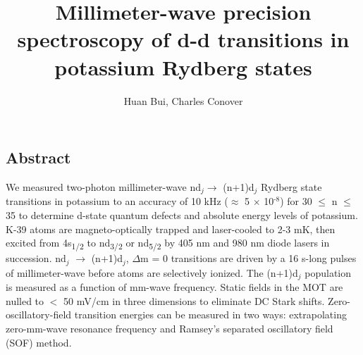 \documentclass[landscape]{sciposter}
\title{Millimeter-wave precision spectroscopy of d-d transitions in potassium Rydberg states}
\author{Huan Bui, Charles Conover}
\institute{Department of Physics and Astronomy, Colby College, Waterville, Maine}
\begin{document}
\renewcommand{\titlesize}{\fontsize{60 pt}{75 pt}\selectfont}
\renewcommand{\authorsize}{\fontsize{38 pt}{45 pt}\selectfont}
\renewcommand{\instsize}{\fontsize{38 pt}{45 pt}\selectfont}
\maketitle

\fontsize{30 pt}{38 pt}\selectfont

\begin{multicols}{4}
\setlength{\columnseprule}{0pt}

\section*{\large Abstract}
{\normalfont We measured two-photon millimeter-wave nd$_j \to$ (n+1)d$_j$ Rydberg state transitions in potassium to an accuracy of 10 kHz ($\approx$ 5 $\times$ 10$^{\text{-8}}$) for 30 $\leq$ n $\leq$ 35 to determine d-state quantum defects and absolute energy levels of potassium. K-39 atoms are magneto-optically trapped and laser-cooled to 2-3 mK, then excited from 4s\textsubscript{1/2} to nd\textsubscript{3/2} or nd\textsubscript{5/2} by 405 nm and 980 nm diode lasers in succession. nd$_j$ $\rightarrow$ (n+1)d$_j$, $\Delta$m = 0 transitions are driven by a 16 \textmu s-long pulses of millimeter-wave before atoms are selectively ionized. The (n+1)d$_j$ population is measured as a function of mm-wave frequency. Static fields in the MOT are nulled to $<$ 50 mV/cm in three dimensions to eliminate DC Stark shifts. Zero-oscillatory-field transition energies can be measured in two ways: extrapolating zero-mm-wave resonance frequency and Ramsey's separated oscillatory field (SOF) method.}


\end{multicols}
\end{document}
